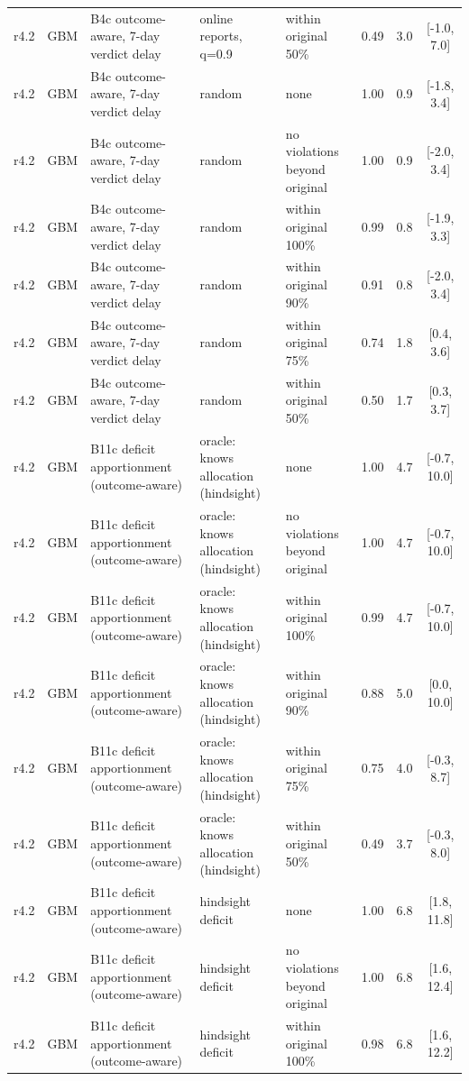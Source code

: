 \documentclass[10pt,onecolumn,letterpaper]{article}
\begin{document}
\begin{longtable}{lllp{4.2cm}p{3.4cm}ccc}
r4.2 & GBM & B4c outcome-aware, 7-day verdict delay & online reports, q=0.9 & within original 50\% & 0.49 & 3.0 & [-1.0, 7.0] \\
r4.2 & GBM & B4c outcome-aware, 7-day verdict delay & random & none & 1.00 & 0.9 & [-1.8, 3.4] \\
r4.2 & GBM & B4c outcome-aware, 7-day verdict delay & random & no violations beyond original & 1.00 & 0.9 & [-2.0, 3.4] \\
r4.2 & GBM & B4c outcome-aware, 7-day verdict delay & random & within original 100\% & 0.99 & 0.8 & [-1.9, 3.3] \\
r4.2 & GBM & B4c outcome-aware, 7-day verdict delay & random & within original 90\% & 0.91 & 0.8 & [-2.0, 3.4] \\
r4.2 & GBM & B4c outcome-aware, 7-day verdict delay & random & within original 75\% & 0.74 & 1.8 & [0.4, 3.6] \\
r4.2 & GBM & B4c outcome-aware, 7-day verdict delay & random & within original 50\% & 0.50 & 1.7 & [0.3, 3.7] \\
r4.2 & GBM & B11c deficit apportionment (outcome-aware) & oracle: knows allocation (hindsight) & none & 1.00 & 4.7 & [-0.7, 10.0] \\
r4.2 & GBM & B11c deficit apportionment (outcome-aware) & oracle: knows allocation (hindsight) & no violations beyond original & 1.00 & 4.7 & [-0.7, 10.0] \\
r4.2 & GBM & B11c deficit apportionment (outcome-aware) & oracle: knows allocation (hindsight) & within original 100\% & 0.99 & 4.7 & [-0.7, 10.0] \\
r4.2 & GBM & B11c deficit apportionment (outcome-aware) & oracle: knows allocation (hindsight) & within original 90\% & 0.88 & 5.0 & [0.0, 10.0] \\
r4.2 & GBM & B11c deficit apportionment (outcome-aware) & oracle: knows allocation (hindsight) & within original 75\% & 0.75 & 4.0 & [-0.3, 8.7] \\
r4.2 & GBM & B11c deficit apportionment (outcome-aware) & oracle: knows allocation (hindsight) & within original 50\% & 0.49 & 3.7 & [-0.3, 8.0] \\
r4.2 & GBM & B11c deficit apportionment (outcome-aware) & hindsight deficit & none & 1.00 & 6.8 & [1.8, 11.8] \\
r4.2 & GBM & B11c deficit apportionment (outcome-aware) & hindsight deficit & no violations beyond original & 1.00 & 6.8 & [1.6, 12.4] \\
r4.2 & GBM & B11c deficit apportionment (outcome-aware) & hindsight deficit & within original 100\% & 0.98 & 6.8 & [1.6, 12.2] \\

\end{longtable}
\end{document}
